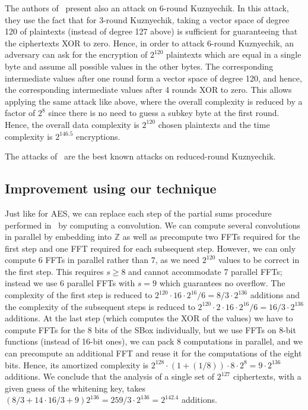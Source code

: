 The authors of~\cite{TOSC:BirKhoPer16} present also an attack on 6-round Kuznyechik. In this attack, they use the fact that for 3-round Kuznyechik, taking a vector space of degree 120 of plaintexts (instead of degree 127 above) is sufficient for guaranteeing that the ciphertexts XOR to zero. Hence, in order to attack 6-round Kuznyechik, an adversary can ask for the encryption of $2^{120}$ plaintexts which are equal in a single byte and assume all possible values in the other bytes. The corresponding intermediate values after one round form a vector space of degree 120, and hence, the corresponding intermediate values after 4 rounds XOR to zero. This allows applying the same attack like above, where the overall complexity is reduced by a factor of $2^8$ since there is no need to guess a subkey byte at the first round. Hence, the overall data complexity is $2^{120}$ chosen plaintexts and the time complexity is $2^{146.5}$ encryptions.

The attacks of~\cite{TOSC:BirKhoPer16} are the best known attacks on reduced-round Kuznyechik.

\subsection{Improvement using our technique} 

Just like for AES, we can replace each step of the partial sums procedure performed in~\cite{TOSC:BirKhoPer16} by computing  a convolution. We can compute several convolutions in parallel by embedding into $\mathbb{Z}$ as well as precompute two FFTs required for the first step and one FFT required for each subsequent step. However, we can only compute 6 FFTs in parallel rather than 7, as we need $2^{120}$ values to be correct in the first step.  This requires $s \ge 8$ and cannot accommodate 7 parallel FFTs; instead we use 6 parallel FFTs with $s=9$ which guarantees no overflow. The complexity of the first step is reduced to $2^{120} \cdot 16 \cdot 2^{16}/6=8/3 \cdot 2^{136}$ additions and the complexity of the subsequent steps is reduced to $2^{120} \cdot 2 \cdot 16 \cdot 2^{16}/6=16/3 \cdot 2^{136}$ additions. At the last step (which computes the XOR of the values) we have to compute FFTs for the 8 bits of the SBox individually, but we use FFTs on 8-bit functions (instead of 16-bit ones), we can pack 8 computations in parallel, and we can precompute an additional FFT and reuse it for the computations of the eight bits. Hence, its amortized complexity is $2^{128} \cdot (1+(1/8)) \cdot 8 \cdot 2^{8}=9 \cdot 2^{136}$ additions. We conclude that the analysis of a single set of $2^{127}$ ciphertexts, with a given guess of the whitening key, takes $(8/3+14\cdot 16/3+9)2^{136}= 259/3 \cdot 2^{136}= 2^{142.4}$ additions.

